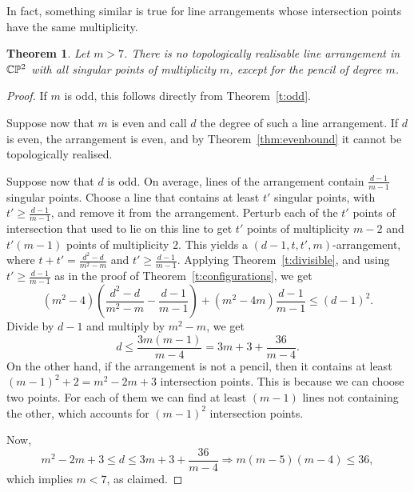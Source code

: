 \documentclass[a4paper,12pt, onesided]{amsart}
\newtheorem{thm}{Theorem}[section]
\theoremstyle{remark}
\numberwithin{figure}{section}
\numberwithin{equation}{section}
\newcommand{\CP}{\mathbb{CP}\vphantom{\mathbb{P}}^2}
\begin{document}
In fact, something similar is true for line arrangements whose intersection points have the same multiplicity.

\begin{thm}
Let $m > 7$.
There is no topologically realisable line arrangement in $\CP$ with all singular points of multiplicity $m$, except for the pencil of degree $m$.
\end{thm}

\begin{proof}
If $m$ is odd, this follows directly from Theorem~\ref{t:odd}.

Suppose now that $m$ is even and call $d$ the degree of such a line arrangement.
If $d$ is even, the arrangement is even, and by Theorem~\ref{thm:evenbound} it cannot be topologically realised.

Suppose now that $d$ is odd.
On average, lines of the arrangement contain $\frac{d-1}{m-1}$ singular points.
Choose a line that contains at least $t'$ singular points, with $t' \ge \frac{d-1}{m-1}$, and remove it from the arrangement.
Perturb each of the $t'$ points of intersection that used to lie on this line to get $t'$ points of multiplicity $m-2$ and $t'(m-1)$ points of multiplicity $2$.
This yields a $(d-1,t,t',m)$-arrangement, where $t+t' = \frac{d^2-d}{m^2-m}$ and $t' \ge \frac{d-1}{m-1}$.
Applying Theorem~\ref{t:divisible}, and using $t' \ge \frac{d-1}{m-1}$ as in the proof of Theorem~\ref{t:configurations}, we get
\[
(m^2-4)\left(\frac{d^2-d}{m^2-m}-\frac{d-1}{m-1}\right) + (m^2-4m)\frac{d-1}{m-1} \le (d-1)^2.
\]
Divide by $d-1$ and multiply by $m^2-m$, we get
\[
d \le  \frac{3m(m-1)}{m - 4} = 3m+3 + \frac{36}{m-4}.
\]
On the other hand, if the arrangement is not a pencil, then it contains at least $(m-1)^2 + 2 = m^2-2m+3$ intersection points.
This is because we can choose two points.
For each of them we can find at least $(m-1)$ lines not containing the other, which accounts for $(m-1)^2$ intersection points.

Now,
\[
m^2-2m+3 \le d \le 3m+3 + \frac{36}{m-4} \Rightarrow m(m-5)(m-4) \le 36,
\]
which implies $m < 7$, as claimed.
\end{proof}






%

\let\MRhref\undefined

\end{document}

